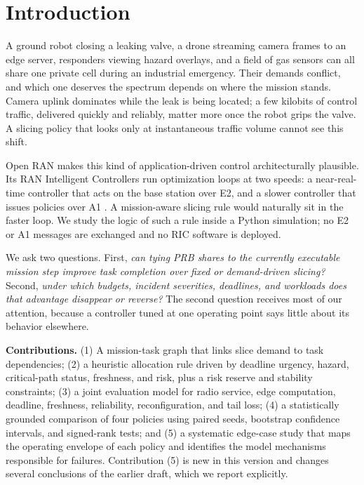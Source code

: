 \documentclass[conference]{IEEEtran}
\begin{document}
\section{Introduction}
A ground robot closing a leaking valve, a drone streaming camera frames to an edge server, responders viewing hazard overlays, and a field of gas sensors can all share one private cell during an industrial emergency. Their demands conflict, and which one deserves the spectrum depends on where the mission stands. Camera uplink dominates while the leak is being located; a few kilobits of control traffic, delivered quickly and reliably, matter more once the robot grips the valve. A slicing policy that looks only at instantaneous traffic volume cannot see this shift.

Open RAN makes this kind of application-driven control architecturally plausible. Its RAN Intelligent Controllers run optimization loops at two speeds: a near-real-time controller that acts on the base station over E2, and a slower controller that issues policies over A1 \cite{oranarch,oranwg3,polese}. A mission-aware slicing rule would naturally sit in the faster loop. We study the logic of such a rule inside a Python simulation; no E2 or A1 messages are exchanged and no RIC software is deployed.

We ask two questions. First, \emph{can tying PRB shares to the currently executable mission step improve task completion over fixed or demand-driven slicing?} Second, \emph{under which budgets, incident severities, deadlines, and workloads does that advantage disappear or reverse?} The second question receives most of our attention, because a controller tuned at one operating point says little about its behavior elsewhere.

\textbf{Contributions.} (1) A mission-task graph that links slice demand to task dependencies; (2) a heuristic allocation rule driven by deadline urgency, hazard, critical-path status, freshness, and risk, plus a risk reserve and stability constraints; (3) a joint evaluation model for radio service, edge computation, deadline, freshness, reliability, reconfiguration, and tail loss; (4) a statistically grounded comparison of four policies using paired seeds, bootstrap confidence intervals, and signed-rank tests; and (5) a systematic edge-case study that maps the operating envelope of each policy and identifies the model mechanisms responsible for failures. Contribution (5) is new in this version and changes several conclusions of the earlier draft, which we report explicitly.
\end{document}
